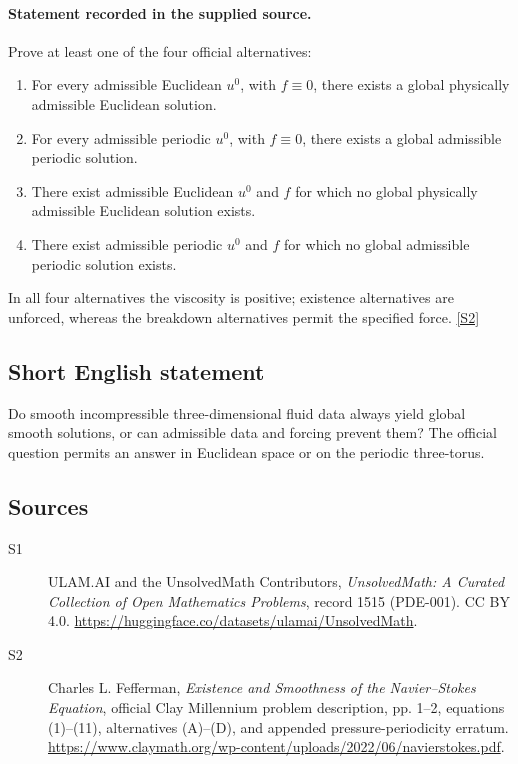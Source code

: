 \documentclass[11pt]{article}
\newcommand{\sref}[2]{\hyperlink{source:#1:#2}{[S#2]}}
\begin{document}
\paragraph{Statement recorded in the supplied source.}
Prove at least one of the four official alternatives:
\begin{enumerate}
 \item[(A)] For every admissible Euclidean \(u^0\), with \(f\equiv0\),
 there exists a global physically admissible Euclidean solution.
 \item[(B)] For every admissible periodic \(u^0\), with \(f\equiv0\),
 there exists a global admissible periodic solution.
 \item[(C)] There exist admissible Euclidean \(u^0\) and \(f\)
 for which no global physically admissible Euclidean solution exists.
 \item[(D)] There exist admissible periodic \(u^0\) and \(f\)
 for which no global admissible periodic solution exists.
\end{enumerate}
In all four alternatives the viscosity is positive; existence alternatives
are unforced, whereas the breakdown alternatives permit the specified force. \sref{1515}{2}
\subsection{Short English statement}
Do smooth incompressible three-dimensional fluid data always yield global smooth solutions, or can admissible data and forcing prevent them? The official question permits an answer in Euclidean space or on the periodic three-torus.
\subsection{Sources}
\begin{description}
\item[\hypertarget{source:1515:1}{S1}] ULAM.AI and the UnsolvedMath Contributors, \emph{UnsolvedMath: A Curated Collection of Open Mathematics Problems}, record 1515 (PDE-001). CC BY 4.0. \url{https://huggingface.co/datasets/ulamai/UnsolvedMath}.
\item[\hypertarget{source:1515:2}{S2}] Charles L. Fefferman, \emph{Existence and Smoothness of the Navier--Stokes Equation}, official Clay Millennium problem description, pp. 1--2, equations (1)--(11), alternatives (A)--(D), and appended pressure-periodicity erratum. \url{https://www.claymath.org/wp-content/uploads/2022/06/navierstokes.pdf}.
\end{description}
\label{end:1515}
\end{document}
